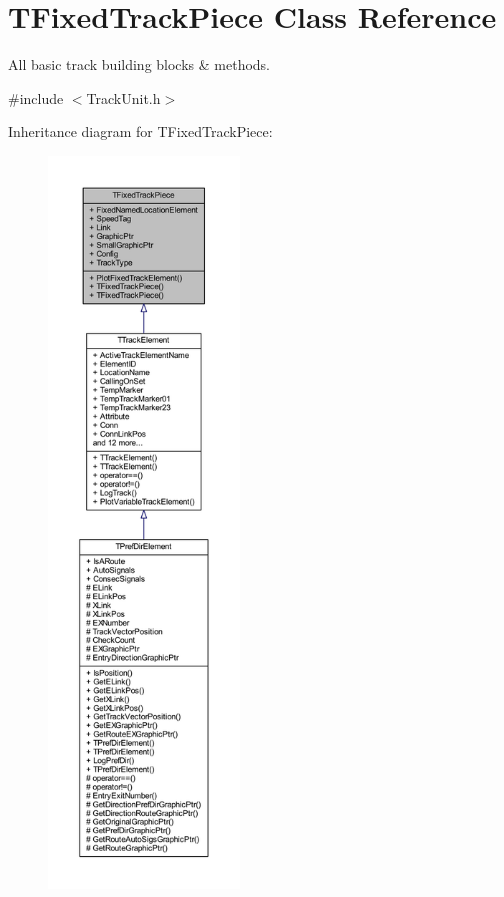 \hypertarget{class_t_fixed_track_piece}{}\section{T\+Fixed\+Track\+Piece Class Reference}
\label{class_t_fixed_track_piece}


All basic track building blocks \& methods.  




{\ttfamily \#include $<$Track\+Unit.\+h$>$}



Inheritance diagram for T\+Fixed\+Track\+Piece\+:
\nopagebreak
\begin{figure}[H]
\begin{center}
\leavevmode
\includegraphics[height=550pt]{class_t_fixed_track_piece__inherit__graph}
\end{center}
\end{figure}


